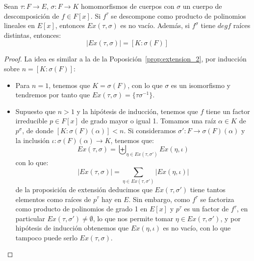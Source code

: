 \begin{prop}\label{prop:extension_3}
    Sean $\tau:F\to E$, $\sigma:F\to K$ homomorfismos de cuerpos con $\sigma$ un cuerpo de descomposición de $f\in F[x]$. Si $f^\tau$ se descompone como producto de polinomios lineales en $E[x]$, entonces $Ex(\tau,\sigma)$ es no vacío. Además, si $f^\sigma$ tiene $deg f$ raíces distintas, entonces:
    \begin{equation*}
        |Ex(\tau, \sigma)| = [K:\sigma(F)]
    \end{equation*}
    \begin{proof}
        La idea es similar a la de la Poposición~\ref{prop:extension_2}, por inducción sobre $n=[K:\sigma(F)]$:
        \begin{itemize}
            \item Para $n = 1$, tenemos que $K = \sigma(F)$, con lo que $\sigma$ es un isomorfismo y tendremos por tanto que $Ex(\tau,\sigma) = \{\tau\sigma^{-1}\}$.
            \item Supuesto que $n>1$ y la hipótesis de inducción, tenemos que $f$ tiene un factor irreducible $p\in F[x]$ de grado mayor o igual 1. Tomamos una raíz $\alpha\in K$ de $p^\sigma$, de donde $[K:\sigma(F)(\alpha)]<n$. Si consideramos $\sigma':F\to \sigma(F)(\alpha)$ y la inclusión $\iota:\sigma(F)(\alpha)\to K$, tenemos que:
                \begin{equation*}
                    Ex(\tau,\sigma) = \biguplus_{\eta\in Ex(\tau,\sigma')}Ex(\eta,\iota)
                \end{equation*}
                con lo que:
                \begin{equation*}
                    |Ex(\tau,\sigma)| = \sum_{\eta \in  Ex(\tau, \sigma')}|Ex(\eta,\iota)|
                \end{equation*}
                de la proposición de extensión deducimos que $Ex(\tau,\sigma')$ tiene tantos elementos como raíces de $p^\tau$ hay en $E$. Sin embargo, como $f^\tau$ se factoriza como producto de polinomios de grado 1 en $E[x]$ y $p^\tau$ es un factor de $f^\tau$, en particular $Ex(\tau,\sigma')\neq \emptyset $, lo que nos permite tomar $\eta \in Ex(\tau,\sigma')$, y por hipótesis de inducción obtenemos que $Ex(\eta, \iota)$ es no vacío, con lo que tampoco puede serlo $Ex(\tau,\sigma)$.


\end{itemize}
\end{proof}
\end{prop}
